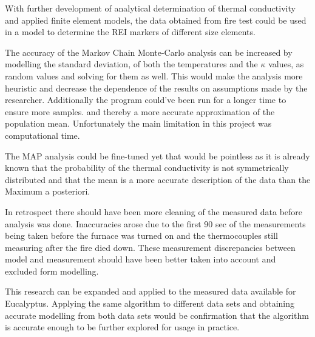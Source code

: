 With further development of analytical determination of thermal conductivity and applied finite element models, the data obtained from fire test could be used in a model to determine the REI markers of different size elements.

The accuracy of the Markov Chain Monte-Carlo analysis can be increased by modelling the standard deviation, of both the temperatures and the $\kappa$ values, as random values and solving for them as well. 
This would make the analysis more heuristic and decrease the dependence of the results on assumptions made by the researcher. 
Additionally the program could've been run for a longer time to ensure more samples. and thereby a more accurate approximation of the population mean. 
Unfortunately the main limitation in this project was computational time.

The MAP analysis could be fine-tuned yet that would be pointless as it is already known that the probability of the thermal conductivity is not symmetrically distributed and that the mean is a more accurate description of the data than the Maximum a posteriori.


In retrospect there should have been more cleaning of the measured data before analysis was done. Inaccuracies arose due to the first 90 sec of the measurements being taken before the furnace was turned on and the thermocouples still measuring after the fire died down.
These measurement discrepancies between model and measurement should have been better taken into account and excluded form modelling. 

This research can be expanded and applied to the measured data available for Eucalyptus. 
Applying the same algorithm to different data sets and obtaining accurate modelling from both data sets would be confirmation that the algorithm is accurate enough to be further explored for usage in practice.



